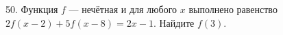 50. Функция $f$ --- нечётная и для любого $x$ выполнено равенство $2f(x-2)+5f(x-8)=2x-1.$ Найдите $f(3).$\\
